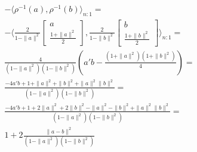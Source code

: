 \documentclass[a4paper, 12pt]{article}
\begin{document}
\begin{equation*}\begin{gathered}
- \langle \rho^{-1}(a),\rho^{-1}(b) \rangle_{n:1} = \\
- \langle \frac{2}{1 - \parallel a \parallel^2} \begin{bmatrix} a \\ \frac{1 + \parallel a \parallel^2}{2} \end{bmatrix}, \frac{2}{1 - \parallel b \parallel^2} \begin{bmatrix} b \\ \frac{1 + \parallel b \parallel^2}{2} \end{bmatrix} \rangle_{n:1} = \\
\frac{4}{(1 - \parallel a \parallel^2)(1 - \parallel b \parallel^2)} \left( a'b - \frac{(1 + \parallel a \parallel^2)(1 + \parallel b \parallel^2)}{4} \right) = \\
\frac{-4a'b + 1 + \parallel a \parallel^2 + \parallel b \parallel^2 + \parallel a \parallel^2 \parallel b \parallel^2}{(1 - \parallel a \parallel^2)(1 - \parallel b \parallel^2)} = \\
\frac{-4a'b + 1 + 2\parallel a \parallel^2 + 2\parallel b \parallel^2 - \parallel a \parallel^2 - \parallel b \parallel^2 + \parallel a \parallel^2 \parallel b \parallel^2}{(1 - \parallel a \parallel^2)(1 - \parallel b \parallel^2)} = \\
1 + 2 \frac{\parallel a - b \parallel^2}{(1 - \parallel a \parallel^2)(1 - \parallel b \parallel^2)}
\end{gathered}\end{equation*}
\end{document}
